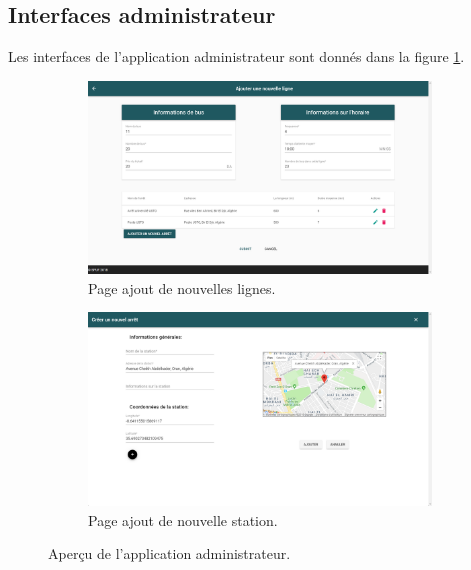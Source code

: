 \subsection{Interfaces administrateur}
Les interfaces de l'application administrateur sont donnés dans la figure \ref{fig:adminInterface}.
\begin{figure}[h!]
	 \begin{subfigure}[b]{\linewidth}
	 	\includegraphics[width=\linewidth]{img/spuf/addline.png}
	 	\caption{Page ajout de nouvelles lignes.}
	 \end{subfigure}
	 
	 \begin{subfigure}[b]{\linewidth}
	 	\includegraphics[width=\linewidth]{img/spuf/createstation.png}
	 	\caption{Page ajout de nouvelle station.}	 
	 \end{subfigure}
	 \caption{Aperçu de l'application administrateur.}
	 \label{fig:adminInterface}
\end{figure}